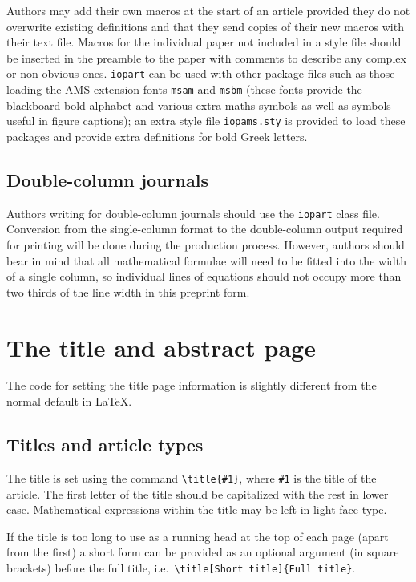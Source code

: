 \documentclass[12pt]{iopart}
\begin{document}
Authors may add their own macros 
at the start of an article provided they do not overwrite existing definitions and 
that they send copies of their new macros with their text file. Macros for the individual paper not included 
in a style file should be inserted in the preamble to the paper with comments to
describe any complex or non-obvious ones.
\verb"iopart" can be used with other package files such
as those loading the AMS extension fonts 
\verb"msam" and \verb"msbm" (these fonts provide the 
blackboard bold alphabet and various extra maths symbols as well as symbols useful in figure 
captions); an extra style file \verb"iopams.sty" is provided to load these
packages and provide extra definitions for bold Greek letters.

\subsection{Double-column journals}
Authors writing for double-column journals should use the \verb"iopart" class file. Conversion from the single-column format to the double-column output required for printing will be done during the production process. 
However, authors should bear in mind that all mathematical formulae will need to be fitted
into the width of a single column, so individual lines of equations should not occupy more than two thirds of the line width in this preprint form.

\section{The title and abstract page} 
The code for setting the title page information is slightly different from
the normal default in \LaTeX. 

\subsection{Titles and article types}
The title is set using the command
\verb"\title{#1}", where \verb"#1" is the title of the article. The
first letter 
of the title should be capitalized with the rest in lower case. 
Mathematical expressions within the title may be left in light-face type. 

If the title is too long to use as a running head at the top of each page (apart from the
first) a short
form can be provided as an optional argument (in square brackets)
before the full title, i.e.\ \verb"\title[Short title]{Full title}".
\end{document}
